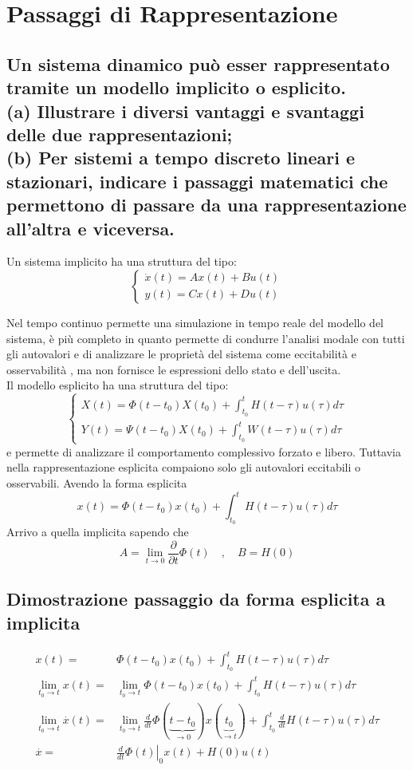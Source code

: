\documentclass{article}
\begin{document}
\section{Passaggi di Rappresentazione}


\subsection{Un sistema dinamico può esser rappresentato tramite un modello implicito o esplicito. \\
(a) Illustrare i diversi vantaggi e svantaggi delle due rappresentazioni; \\
(b) Per sistemi a tempo discreto lineari e stazionari, indicare i passaggi matematici che permettono
di passare da una rappresentazione all'altra e viceversa.
}
Un sistema implicito ha una struttura del tipo:
$$
\begin{cases}
    \dot{x}(t) = Ax(t)+Bu(t)\\
    y(t) = Cx(t)+Du(t)
\end{cases}
$$

Nel tempo continuo permette una simulazione in tempo reale del modello del sistema, è più completo in quanto permette di condurre l'analisi modale con tutti gli autovalori e di analizzare le proprietà del sistema come eccitabilità e osservabilità , ma non fornisce le espressioni dello stato e dell'uscita.\\
Il modello esplicito ha una struttura del tipo:
\[
\begin{cases}
    X(t) = \Phi(t-t_0)X(t_0)+\int_{t_0}^{t}H(t-\tau)u(\tau)d\tau\\
    Y(t) = \Psi(t-t_0)X(t_0)+\int_{t_0}^{t}W(t-\tau)u(\tau)d\tau
\end{cases}
\]
e permette di analizzare il comportamento complessivo forzato e libero.
Tuttavia nella rappresentazione esplicita compaiono solo gli autovalori eccitabili o osservabili.
Avendo la forma esplicita 
\[     x(t) = \Phi(t-t_0)x(t_0)+\int_{t_0}^{t} H(t-\tau)u(\tau)d\tau \]
Arrivo a quella implicita sapendo che 
\[ A = \lim_{t\to 0}\frac{\partial }{\partial t}\Phi(t) \quad,\quad B = H(0) \]


\subsection{Dimostrazione passaggio da forma esplicita a implicita}

\begin{align*}
    x(t)  = & \Phi(t-t_0)x(t_0)+\int_{t_0}^{t}H(t-\tau)u(\tau)d\tau \\
    \lim_{t_0\to t}x(t)  = & \lim_{t_0\to t} \Phi(t-t_0)x(t_0)+\int_{t_0}^{t}H(t-\tau)u(\tau)d\tau \\
    \lim_{t_0\to t}\overset{\cdot}{x}(t)  = &\lim_{t_0\to t} \frac{d}{dt}\Phi(\underbrace{t-t_0}_{\to 0})x(\underbrace{t_0}_{\to t})
        +\int_{t_0}^{t}\frac{d}{dt}H(t-\tau)u(\tau)d\tau\\
        \overset{\cdot}{x}  = & \left.\frac{d}{dt}\Phi(t)\right|_{0}x(t)+H(0)u(t)
\end{align*}
\end{document}
